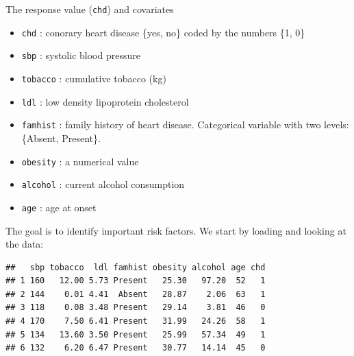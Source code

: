 \documentclass[10pt,ignorenonframetext,]{beamer}
\newenvironment{Shaded}{\begin{snugshade}}{\end{snugshade}}
\newcommand{\KeywordTok}[1]{\textcolor[rgb]{0.13,0.29,0.53}{\textbf{#1}}}
\newcommand{\StringTok}[1]{\textcolor[rgb]{0.31,0.60,0.02}{#1}}
\newcommand{\OperatorTok}[1]{\textcolor[rgb]{0.81,0.36,0.00}{\textbf{#1}}}
\newcommand{\NormalTok}[1]{#1}
\providecommand{\tightlist}{%
  \setlength{\itemsep}{0pt}\setlength{\parskip}{0pt}}
\begin{document}
\begin{frame}[fragile]

The response value (\texttt{chd}) and covariates

\begin{itemize}
\tightlist
\item
  \texttt{chd} : conorary heart disease \{yes, no\} coded by the numbers
  \{1, 0\}
\item
  \texttt{sbp} : systolic blood pressure\\
\item
  \texttt{tobacco} : cumulative tobacco (kg)\\
\item
  \texttt{ldl} : low density lipoprotein cholesterol
\item
  \texttt{famhist} : family history of heart disease. Categorical
  variable with two levels: \{Absent, Present\}.
\item
  \texttt{obesity} : a numerical value
\item
  \texttt{alcohol} : current alcohol consumption
\item
  \texttt{age} : age at onset
\end{itemize}

The goal is to identify important risk factors. We start by loading and
looking at the data:

\end{frame}

\begin{frame}[fragile]

\footnotesize

\begin{Shaded}
\end{Shaded}

\begin{verbatim}
##   sbp tobacco  ldl famhist obesity alcohol age chd
## 1 160   12.00 5.73 Present   25.30   97.20  52   1
## 2 144    0.01 4.41  Absent   28.87    2.06  63   1
## 3 118    0.08 3.48 Present   29.14    3.81  46   0
## 4 170    7.50 6.41 Present   31.99   24.26  58   1
## 5 134   13.60 3.50 Present   25.99   57.34  49   1
## 6 132    6.20 6.47 Present   30.77   14.14  45   0
\end{verbatim}

\normalsize

\end{frame}
\end{document}
